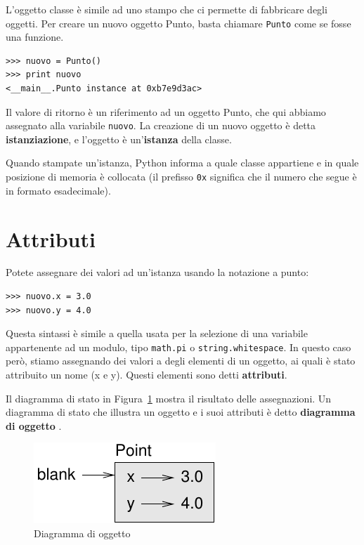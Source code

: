\documentclass[10pt]{book}
\begin{document}
L'oggetto classe è simile ad uno stampo che ci permette di fabbricare degli oggetti. Per creare un nuovo oggetto Punto, basta chiamare {\tt Punto} come se fosse una funzione.

\begin{verbatim}
>>> nuovo = Punto()
>>> print nuovo
<__main__.Punto instance at 0xb7e9d3ac>
\end{verbatim}
%
Il valore di ritorno è un riferimento ad un oggetto Punto, che qui abbiamo assegnato alla variabile {\tt nuovo}.  
La creazione di un nuovo oggetto è detta
{\bf istanziazione}, e l'oggetto è un'{\bf istanza} della classe.

Quando stampate un'istanza, Python informa a quale classe appartiene e in quale posizione di memoria è collocata (il prefisso {\tt 0x} significa che il numero che segue è in formato esadecimale).


\section{Attributi}
\label{attributes}

Potete assegnare dei valori ad un'istanza usando la notazione a punto:

\begin{verbatim}
>>> nuovo.x = 3.0
>>> nuovo.y = 4.0
\end{verbatim}
%
Questa sintassi è simile a quella usata per la selezione di una variabile appartenente ad un modulo, tipo {\tt math.pi} o {\tt string.whitespace}.  In questo caso però, stiamo assegnando dei valori a degli elementi di un oggetto, ai quali è stato attribuito un nome (x e y). Questi elementi sono detti {\bf attributi}.

Il diagramma di stato in Figura~\ref{fig.point} mostra il risultato delle assegnazioni. Un diagramma di stato che illustra un oggetto e i suoi attributi è detto {\bf diagramma di oggetto} .

\begin{figure}
\centerline
{\includegraphics[scale=0.8]{figs/point.pdf}}
\caption{Diagramma di oggetto}
\label{fig.point}
\end{figure}
\end{document}
